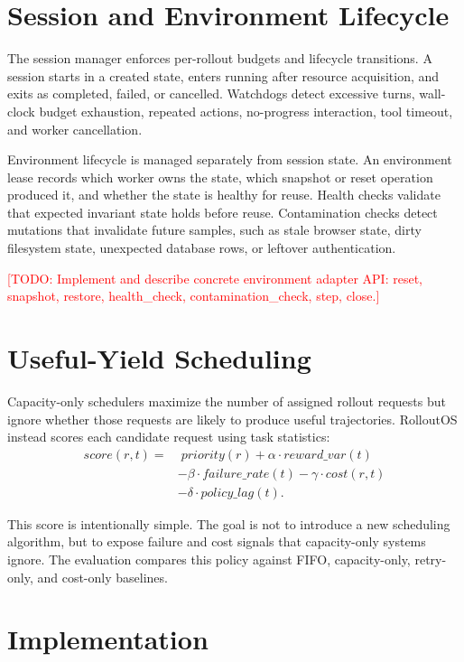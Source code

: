 \documentclass{article}
\newcommand{\sys}{RolloutOS}
\newcommand{\todo}[1]{\textcolor{red}{[TODO: #1]}}
\begin{document}
\section{Session and Environment Lifecycle}

The session manager enforces per-rollout budgets and lifecycle transitions.
A session starts in a created state, enters running after resource acquisition, and exits as completed, failed, or cancelled.
Watchdogs detect excessive turns, wall-clock budget exhaustion, repeated actions, no-progress interaction, tool timeout, and worker cancellation.

Environment lifecycle is managed separately from session state.
An environment lease records which worker owns the state, which snapshot or reset operation produced it, and whether the state is healthy for reuse.
Health checks validate that expected invariant state holds before reuse.
Contamination checks detect mutations that invalidate future samples, such as stale browser state, dirty filesystem state, unexpected database rows, or leftover authentication.

\todo{Implement and describe concrete environment adapter API: reset, snapshot, restore, health\_check, contamination\_check, step, close.}

\section{Useful-Yield Scheduling}

Capacity-only schedulers maximize the number of assigned rollout requests but ignore whether those requests are likely to produce useful trajectories.
\sys{} instead scores each candidate request using task statistics:
\begin{equation}
\begin{split}
score(r, t) = &\; priority(r) + \alpha \cdot reward\_var(t) \\
& - \beta \cdot failure\_rate(t) - \gamma \cdot cost(r,t) \\
& - \delta \cdot policy\_lag(t).
\end{split}
\end{equation}

This score is intentionally simple.
The goal is not to introduce a new scheduling algorithm, but to expose failure and cost signals that capacity-only systems ignore.
The evaluation compares this policy against FIFO, capacity-only, retry-only, and cost-only baselines.

\section{Implementation}
\end{document}
